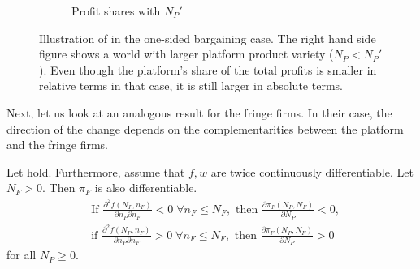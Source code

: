 \begin{figure}[ht]
\begin{subfigure}[b]{0.45\textwidth}
        \caption{Profit shares with $N_P'$}
    \end{subfigure}
    \caption{Illustration of  in the one-sided bargaining case. The right hand side figure shows a world with larger platform product variety ($N_P < N_P'$). Even though the platform's share of the total profits is smaller in relative terms in that case, it is still larger in absolute terms.}
    \label{fig:increase_N_P_platform}
\end{figure}

Next, let us look at an analogous result for the fringe firms.
In their case, the direction of the change depends on the complementarities between the platform and the fringe firms.
\begin{proposition}
    \label{prop:share_of_fringe}
    Let  hold.
    Furthermore, assume that $f, w$ are twice continuously differentiable.
    Let $N_F > 0$.
    Then $\pi_F$ is also differentiable.
    \begin{align*}
        &\text{If } \frac{\partial^2 f(N_P, n_F)}{\partial n_P \partial n_F} < 0 \;\forall n_F \leq N_F, \text{ then } \frac{\partial \pi_F(N_P, N_F)}{\partial N_P} < 0, \\
        &\text{if } \frac{\partial^2 f(N_P, n_F)}{\partial n_P \partial n_F} > 0 \;\forall n_F \leq N_F, \text{ then } \frac{\partial \pi_F(N_P, N_F)}{\partial N_P} > 0
    \end{align*}
    for all $N_P \geq 0$.
\end{proposition}
